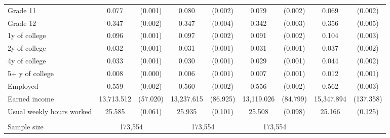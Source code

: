 \begin{tabular}{lcccccccc}
 \hspace{0.3cm} Grade 11   & 0.077 & (0.001)  & 0.080 & (0.002)  & 0.079 & (0.002)  & 0.069 & (0.002)  \\
 \hspace{0.3cm} Grade 12   & 0.347 & (0.002)  & 0.347 & (0.004)  & 0.342 & (0.003)  & 0.356 & (0.005)  \\
 \hspace{0.3cm} 1y of college   & 0.096 & (0.001)  & 0.097 & (0.002)  & 0.091 & (0.002)  & 0.104 & (0.003)  \\
 \hspace{0.3cm} 2y of college   & 0.032 & (0.001)  & 0.031 & (0.001)  & 0.031 & (0.001)  & 0.037 & (0.002)  \\
 \hspace{0.3cm} 4y of college   & 0.033 & (0.001)  & 0.030 & (0.001)  & 0.029 & (0.001)  & 0.044 & (0.002)  \\
 \hspace{0.3cm} 5$+$ y of college   & 0.008 & (0.000)  & 0.006 & (0.001)  & 0.007 & (0.001)  & 0.012 & (0.001)  \\
 Employed   & 0.559 & (0.002)  & 0.560 & (0.002)  & 0.556 & (0.002)  & 0.562 & (0.003)  \\
 Earned income   & 13,713.512 & (57.020)  & 13,237.615 & (86.925)  & 13,119.026 & (84.799)  & 15,347.894 & (137.358)  \\
 Usual weekly hours worked   & 25.585 & (0.061)  & 25.935 & (0.101)  & 25.508 & (0.098)  & 25.166 & (0.125)  \\
\\
Sample size & \multicolumn{2}{c}{173,554} & \multicolumn{2}{c}{173,554} & \multicolumn{2}{c}{173,554} \\
\bottomrule
\bottomrule
\end{tabular}